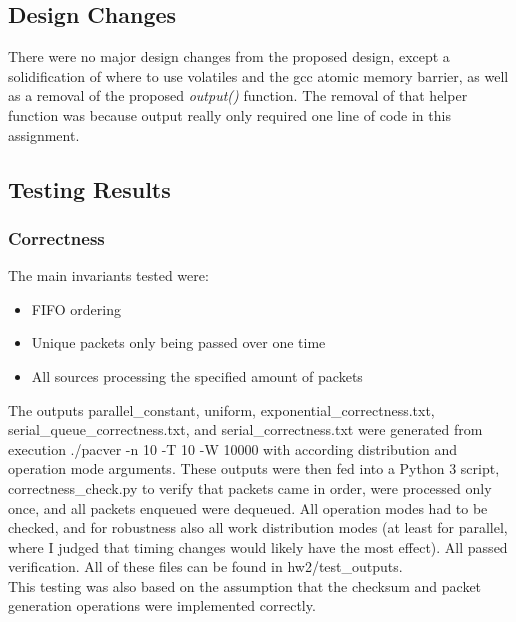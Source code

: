 \documentclass{article}
\begin{document}
\begin{adjustwidth}{-2cm}{-2cm}
\subsection{Design Changes}
There were no major design changes from the proposed design, except a solidification of where to use volatiles and the gcc atomic memory barrier, as well as a removal of the proposed \textit{output()} function. The removal of that helper function was because output really only required one line of code in this assignment.
\subsection{Testing Results}
\subsubsection{Correctness}
The main invariants tested were:
\begin{itemize}
    \item FIFO ordering
    \item Unique packets only being passed over one time
    \item All sources processing the specified amount of packets
\end{itemize}
The outputs parallel\_constant, uniform, exponential\_correctness.txt, serial\_queue\_correctness.txt, and serial\_correctness.txt were generated from execution ./pacver -n 10 -T 10 -W 10000 with according distribution and operation mode arguments. These outputs were then fed into a Python 3 script, correctness\_check.py to verify that packets came in order, were processed only once, and all packets enqueued were dequeued. All operation modes had to be checked, and for robustness also all work distribution modes (at least for parallel, where I judged that timing changes would likely have the most effect). All passed verification. All of these files can be found in hw2/test\_outputs.\\
This testing was also based on the assumption that the checksum and packet generation operations were implemented correctly.

\end{adjustwidth}
\end{document}
